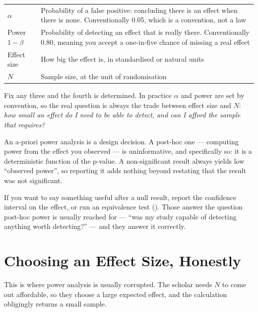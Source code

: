 \begin{center}
\small
\begin{tabular}{@{}L{2.6cm}L{11.7cm}@{}}
\toprule
$\alpha$        & Probability of a false positive: concluding there is an
                  effect when there is none. Conventionally 0.05, which is a
                  convention, not a law \\
Power $1-\beta$ & Probability of detecting an effect that is really there.
                  Conventionally 0.80, meaning you accept a one-in-five chance
                  of missing a real effect \\
Effect size     & How big the effect is, in standardised or natural units \\
$N$             & Sample size, at the unit of randomisation \\
\bottomrule
\end{tabular}
\end{center}

Fix any three and the fourth is determined. In practice $\alpha$ and power are
set by convention, so the real question is always the trade between effect size
and $N$: \emph{how small an effect do I need to be able to detect, and can I
afford the sample that requires?}

\begin{alertbox}
An a-priori power analysis is a design decision. A post-hoc one --- computing
power from the effect you observed --- is uninformative, and specifically so:
it is a deterministic function of the p-value. A non-significant result always
yields low ``observed power'', so reporting it adds nothing beyond restating
that the result was not significant.

\medskip
If you want to say something useful after a null result, report the confidence
interval on the effect, or run an equivalence test (). Those
answer the question post-hoc power is usually reached for --- ``was my study
capable of detecting anything worth detecting?'' --- and they answer it
correctly.
\end{alertbox}

\section{Choosing an Effect Size, Honestly}

This is where power analysis is usually corrupted. The scholar needs $N$ to
come out affordable, so they choose a large expected effect, and the
calculation obligingly returns a small sample.

